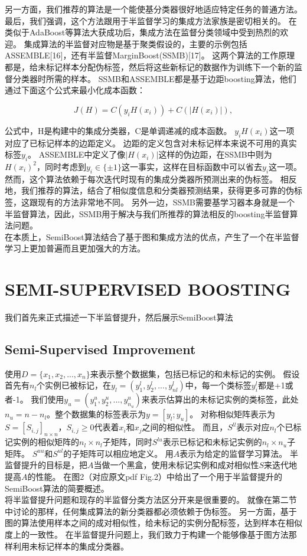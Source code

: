 \documentclass[10pt,journal,compsoc]{IEEEtran}
\begin{document}
另一方面，我们推荐的算法是一个能使基分类器很好地适应特定任务的普通方法。\\
最后，我们强调，这个方法跟用于半监督学习的集成方法家族是密切相关的。
在类似于AdaBoost等算法大获成功后，集成方法在监督分类领域中受到热烈的欢迎。
集成算法的半监督对应物是基于聚类假设的，主要的示例包括ASSEMBLE[16]，还有半监督MarginBoost(SSMB)[17]。
这两个算法的工作原理都是，给未标记样本分配伪标签，然后将这些新标记的数据作为训练下一个新的监督分类器时所需的样本。
SSMB和ASSEMBLE都是基于边距boosting算法，他们通过下面这个公式来最小化成本函数：
\begin{center}
\[J(H)=C(y_iH(x_i))+C(\vert H(x_i)\vert),\]
\end{center}
公式中，H是构建中的集成分类器，C是单调递减的成本函数。
$y_iH(x_i)$这一项对应了已标记样本的边距定义。
边距的定义包含对未标记样本来说不可用的真实标签$y_i$。
ASSEMBLE中定义了像$\vert H(x_i)\vert$这样的伪边距，在SSMB中则为$H(x_i)^2$，同时考虑到$y_i\in\{\pm1\}$这一事实，这样在目标函数中可以省去$y_i$这一项。
然而，这个算法依赖于每次迭代时现有的集成分类器所预测出来的伪标签。
相反地，我们推荐的算法，结合了相似度信息和分类器预测结果，获得更多可靠的伪标签，这跟现有的方法非常地不同。
另外一边，SSMB需要基学习器本身就是一个半监督算法，因此，SSMB用于解决与我们所推荐的算法相反的boosting半监督算法问题。\\
在本质上，SemiBoost算法结合了基于图和集成方法的优点，产生了一个在半监督学习上更加普遍而且更加强大的方法。%
\section{SEMI-SUPERVISED BOOSTING}
我们首先来正式描述一下半监督提升，然后展示SemiBoost算法%
\subsection{Semi-Supervised Improvement}
使用$D=\{x_1, x_2, ... , x_n\}$来表示整个数据集，包括已标记的和未标记的实例。
假设首先有$n_l$个实例已被标记，在$y_l=(y_1^l,y_2^l,...,y_{nl}^l)$中，每一个类标签$y_i^l$都是+1或者-1。
我们使用$y_u=(y_1^u,y_2^u,...,y_{n_u}^u)$来表示估算出的未标记实例的类标签，此处$n_u=n-n_l$。整个数据集的标签表示为$y=[y_l;y_u]$。
对称相似矩阵表示为$S=[S_{i,j}]_{n\times n}$，$S_{i,j}\geq0$代表着$x_i$和$x_j$之间的相似性。
而且，$S^{ll}$表示对应$n_l$个已标记实例的相似矩阵的$n_l\times n_l$子矩阵，同时$S^{lu}$表示已标记和未标记实例的$n_l\times n_u$子矩阵。
$S^{uu}$和$S^{ul}$的子矩阵可以相应地定义。
用$A$表示为给定的监督学习算法。
半监督提升的目标是，把$A$当做一个黑盒，使用未标记实例和成对相似性$S$来迭代地提高$A$的性能。
在图2（对应原文pdf Fig.2）中给出了一个用于半监督提升的SemiBoost算法的简要概述。\\
将半监督提升问题和现存的半监督分类方法区分开来是很重要的。
就像在第二节中讨论的那样，任何集成算法的新分类器都必须依赖于伪标签。
另一方面，基于图的算法使用样本之间的成对相似性，给未标记的实例分配标签，达到样本在相似度上的一致性。
在半监督提升问题上，我们致力于构建一个能够像基于图方法那样利用未标记样本的集成分类器。
\end{document}
